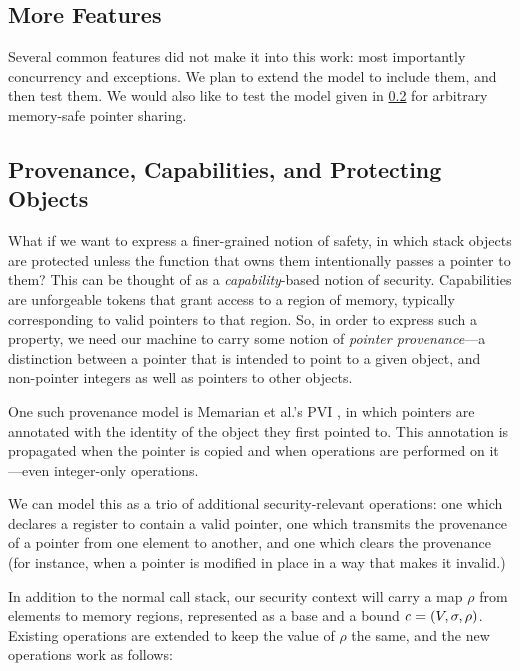 \documentclass[10pt,conference]{ieeetran}%
\theoremstyle{definition}
\begin{document}
\subsection{More Features}

Several common features did not make it into this work: most importantly concurrency and
exceptions. We plan to extend the model to include them, and then test them. We would also
like to test the model given in \cref{app:ptr} for arbitrary memory-safe pointer sharing.




\appendix

\subsection{Provenance, Capabilities, and Protecting Objects}
\label{app:ptr}

What if we want to express a finer-grained notion of safety, in which
stack objects are protected unless the function that owns them intentionally
passes a pointer to them? This can be thought of as a {\it capability}-based
notion of security. Capabilities are unforgeable tokens that grant access to
a region of memory, typically corresponding to valid pointers to that region.
So, in order to express such a property, we need our machine to carry some notion
of {\it pointer provenance}---a distinction between a pointer that is intended to
point to a given object, and non-pointer integers as well as pointers to other objects.

One such provenance model is Memarian et al.'s PVI \cite{provenance}, in which pointers are
annotated with the identity of the object they first pointed to. This annotation is
propagated when the pointer is copied and when operations are performed on it---even
integer-only operations.

We can model this as a trio of additional security-relevant operations: one which
declares a register to contain a valid pointer, one which transmits the provenance
of a pointer from one element to another, and one which clears the provenance
(for instance, when a pointer is modified in place in a way that makes it invalid.)

In addition to the normal call stack, our security context will carry a map \(\rho\) from
elements to memory regions, represented as a base and a bound \(\mathit{c} = (V, \sigma, \rho)\).
Existing operations are extended to keep the value of \(\rho\) the same, and the new operations
work as follows:
\end{document}
